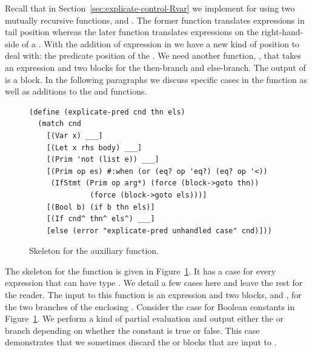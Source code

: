 \documentclass[11pt]{book}
\begin{document}
{%


Recall that in Section~\ref{sec:explicate-control-Rvar} we implement
 for \LangVar{} using two mutually recursive
functions,  and .  The
former function translates expressions in tail position whereas the
later function translates expressions on the right-hand-side of a
. With the addition of  expression in \LangIf{} we
have a new kind of position to deal with: the predicate position of
the . We need another function, , that
takes an \LangIf{} expression and two blocks for the then-branch and
else-branch. The output of  is a block.
%
In the following paragraphs we discuss specific cases in the
 function as well as additions to the
 and  functions.

\begin{figure}[tbp]
\begin{lstlisting}
(define (explicate-pred cnd thn els)
  (match cnd
    [(Var x) ___]
    [(Let x rhs body) ___]
    [(Prim 'not (list e)) ___]
    [(Prim op es) #:when (or (eq? op 'eq?) (eq? op '<))
     (IfStmt (Prim op arg*) (force (block->goto thn))
              (force (block->goto els)))]
    [(Bool b) (if b thn els)]
    [(If cnd^ thn^ els^) ___]
    [else (error "explicate-pred unhandled case" cnd)]))
\end{lstlisting}
\caption{Skeleton for the  auxiliary function.}
\label{fig:explicate-pred}
\end{figure}

The skeleton for the  function is given in
Figure~\ref{fig:explicate-pred}. It has a case for every expression
that can have type .  We detail a few cases here and
leave the rest for the reader. The input to this function is an
expression and two blocks,  and , for the two
branches of the enclosing .
%
Consider the case for Boolean constants in
Figure~\ref{fig:explicate-pred}.  We perform a kind of partial
evaluation and output either the 
or  branch depending on whether the constant is true or
false. This case demonstrates that we sometimes discard the 
or  blocks that are input to .

}
\end{document}
